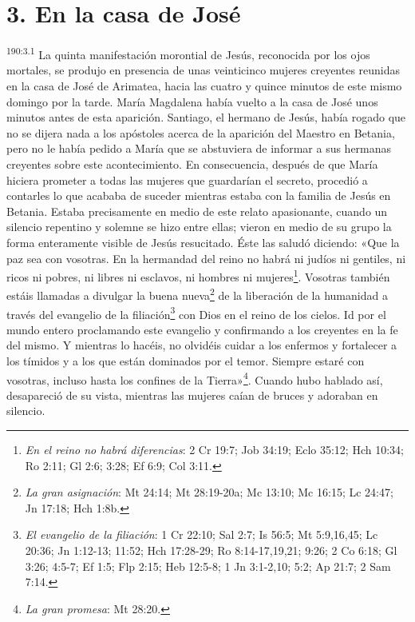 \section*{3. En la casa de José}
\par 
\textsuperscript{190:3.1} La quinta manifestación morontial de Jesús, reconocida por los ojos mortales, se produjo en presencia de unas veinticinco mujeres creyentes reunidas en la casa de José de Arimatea, hacia las cuatro y quince minutos de este mismo domingo por la tarde. María Magdalena había vuelto a la casa de José unos minutos antes de esta aparición. Santiago, el hermano de Jesús, había rogado que no se dijera nada a los apóstoles acerca de la aparición del Maestro en Betania, pero no le había pedido a María que se abstuviera de informar a sus hermanas creyentes sobre este acontecimiento. En consecuencia, después de que María hiciera prometer a todas las mujeres que guardarían el secreto, procedió a contarles lo que acababa de suceder mientras estaba con la familia de Jesús en Betania. Estaba precisamente en medio de este relato apasionante, cuando un silencio repentino y solemne se hizo entre ellas; vieron en medio de su grupo la forma enteramente visible de Jesús resucitado. Éste las saludó diciendo: «Que la paz sea con vosotras. En la hermandad del reino no habrá ni judíos ni gentiles, ni ricos ni pobres, ni libres ni esclavos, ni hombres ni mujeres\footnote{\textit{En el reino no habrá diferencias}: 2 Cr 19:7; Job 34:19; Eclo 35:12; Hch 10:34; Ro 2:11; Gl 2:6; 3:28; Ef 6:9; Col 3:11.}. Vosotras también estáis llamadas a divulgar la buena nueva\footnote{\textit{La gran asignación}: Mt 24:14; Mt 28:19-20a; Mc 13:10; Mc 16:15; Lc 24:47; Jn 17:18; Hch 1:8b.} de la liberación de la humanidad a través del evangelio de la filiación\footnote{\textit{El evangelio de la filiación}: 1 Cr 22:10; Sal 2:7; Is 56:5; Mt 5:9,16,45; Lc 20:36; Jn 1:12-13; 11:52; Hch 17:28-29; Ro 8:14-17,19,21; 9:26; 2 Co 6:18; Gl 3:26; 4:5-7; Ef 1:5; Flp 2:15; Heb 12:5-8; 1 Jn 3:1-2,10; 5:2; Ap 21:7; 2 Sam 7:14.} con Dios en el reino de los cielos. Id por el mundo entero proclamando este evangelio y confirmando a los creyentes en la fe del mismo. Y mientras lo hacéis, no olvidéis cuidar a los enfermos y fortalecer a los tímidos y a los que están dominados por el temor. Siempre estaré con vosotras, incluso hasta los confines de la Tierra»\footnote{\textit{La gran promesa}: Mt 28:20.}. Cuando hubo hablado así, desapareció de su vista, mientras las mujeres caían de bruces y adoraban en silencio.

